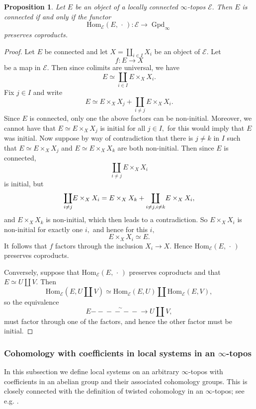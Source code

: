 \documentclass[12pt]{amsart}
\newtheorem{proposition}[dummy]{Proposition}
\theoremstyle{definition}
\newcommand{\cE}{\mathcal{E}}
\newcommand{\Hom}{\mathrm{Hom}}
\renewcommand{\i}{\infty}
\def\iGpd{\operatorname{Gpd}_\i}
\def\blank{\mspace{3mu}\cdot\mspace{3mu}}
\def\longlongrightarrow{-\!\!\!-\!\!\!-\!\!\!-\!\!\!-\!\!\!-\!\!\!\longrightarrow}
\begin{document}
\begin{proposition}\label{prop: coproducts}
Let $E$ be an object of a locally connected $\i$-topos $\cE.$ Then $E$ is connected if and only if the functor $$\Hom_{\cE}\left(E,\blank\right):\cE \to \iGpd$$ preserves coproducts.
\end{proposition}

\begin{proof}
Let $E$ be connected and let $X=\underset{i \in I} \coprod X_i$ be an object of $\cE.$ Let $$f:E \to X$$ be a map in $\cE.$ Then since colimits are universal, we have $$E \simeq \underset{i \in I} \coprod E\times_X X_i.$$ Fix $j \in I$ and write $$E\simeq E\times_X X_j + \underset{i \ne j} \coprod E\times_X X_i.$$ Since $E$ is connected, 
only one the above factors can be non-initial. Moreover, we cannot have that $E\simeq E\times_X X_j$ is initial for all $j \in I,$ for this would imply that $E$ was initial. Now suppose by way of contradiction that there is $j \ne k$ in $I$ such that $E\simeq E\times_X X_j$ and $E\simeq E\times_X X_k$ are both non-initial. Then since $E$ is connected, $$\underset{i \ne j} \coprod E\times_X X_i$$ is initial, but $$\underset{i \ne j} \coprod E\times_X X_i=E\times_X X_k +
\underset{i \ne j,\\ i \ne k} \coprod E\times_X X_i,$$ and $E\times_X X_k$ is non-initial, which then leads to a contradiction. So $E\times_X X_i$ is non-initial for exactly one $i,$ and hence for this $i,$ $$E\times_X X_i \simeq E.$$ It follows that $f$ factors through the inclusion $X_i \to X.$ Hence $\Hom_{\cE}\left(E,\blank\right)$ preserves coproducts.

Conversely, suppose that $\Hom_{\cE}\left(E,\blank\right)$ preserves coproducts and that $E\simeq U \coprod V.$ Then $$\Hom_{\cE}\left(E,U \coprod V \right) \simeq \Hom_{\cE}\left(E,U \right) \coprod \Hom_{\cE}\left(E,V\right),$$ so the equivalence $$E \stackrel{\sim}{\longlongrightarrow} U \coprod V,$$ must factor through one of the factors, and hence the other factor must be initial.
\end{proof}

\subsubsection{Cohomology with coefficients in local systems in an $\i$-topos}

In this subsection we define local systems on an arbitrary $\i$-topos with coefficients in an abelian group and their associated cohomology groups. This is closely connected with the definition of twisted cohomology in an $\i$-topos; see e.g. \cite[Section 4]{principal}.
\end{document}
